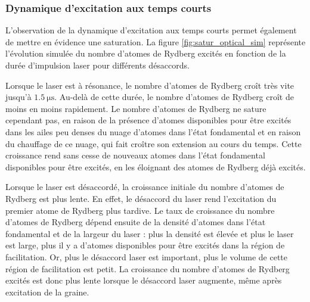 \clearpage
\subsubsection*{Dynamique d'excitation aux temps courts}
\noindent L'observation de la dynamique d'excitation aux temps courts permet également de mettre en évidence une saturation.
La figure \eqref{fig:satur_optical_sim} représente l'évolution simulée du nombre  d'atomes de Rydberg excités en fonction de la durée d'impulsion laser pour différents désaccords.%

Lorsque le laser est à résonance, le nombre d'atomes de Rydberg croît très vite jusqu'à $\SI{1.5}{\us}$.
Au-delà de cette durée, le nombre d'atomes de Rydberg croît de moins en moins rapidement.
Le nombre d'atomes de Rydberg ne sature cependant pas, en raison de la présence d'atomes disponibles pour être excités dans les ailes peu denses du nuage d'atomes dans l'état fondamental et en raison du chauffage de ce nuage, qui fait croître son extension au cours du temps.
Cette croissance rend sans cesse de nouveaux atomes dans l'état fondamental disponibles pour être excités, en les éloignant des atomes de Rydberg déjà excités.

Lorsque le laser est désaccordé, la croissance initiale du nombre d'atomes de Rydberg est plus lente.
En effet, le désaccord du laser rend l'excitation du premier atome de Rydberg plus tardive.
Le taux de croissance du nombre d'atomes de Rydberg dépend ensuite de la densité d'atomes dans l'état fondamental et de la largeur du laser : plus la densité est élevée et plus le laser est large, plus il y a d'atomes disponibles pour être excités dans la région de facilitation.
Or, plus le désaccord laser est important, plus le volume de cette région de facilitation est petit.
La croissance du nombre d'atomes de Rydberg excités est donc plus lente lorsque le désaccord laser augmente, même après excitation de la graine.

